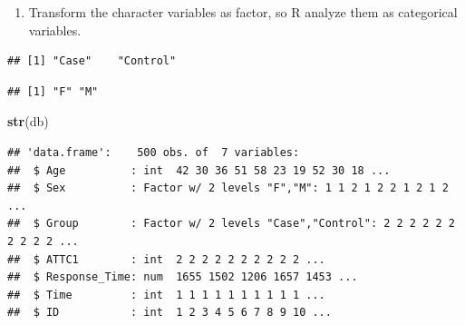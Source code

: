 \documentclass[
]{article}
\newenvironment{Shaded}{\begin{snugshade}}{\end{snugshade}}
\newcommand{\FunctionTok}[1]{\textcolor[rgb]{0.13,0.29,0.53}{\textbf{#1}}}
\newcommand{\NormalTok}[1]{#1}
\newcommand{\OtherTok}[1]{\textcolor[rgb]{0.56,0.35,0.01}{#1}}
\newcommand{\SpecialCharTok}[1]{\textcolor[rgb]{0.81,0.36,0.00}{\textbf{#1}}}
\providecommand{\tightlist}{%
  \setlength{\itemsep}{0pt}\setlength{\parskip}{0pt}}
\begin{document}
\begin{enumerate}
\def\labelenumi{\alph{enumi}.}
\setcounter{enumi}{3}
\tightlist
\item
  Transform the character variables as factor, so R analyze them as
  categorical variables.
\end{enumerate}

\begin{Shaded}
\end{Shaded}

\begin{verbatim}
## [1] "Case"    "Control"
\end{verbatim}

\begin{Shaded}
\end{Shaded}

\begin{verbatim}
## [1] "F" "M"
\end{verbatim}

\begin{Shaded}
\begin{Highlighting}[]
\FunctionTok{str}\NormalTok{(db)}
\end{Highlighting}
\end{Shaded}

\begin{verbatim}
## 'data.frame':    500 obs. of  7 variables:
##  $ Age          : int  42 30 36 51 58 23 19 52 30 18 ...
##  $ Sex          : Factor w/ 2 levels "F","M": 1 1 2 1 2 2 1 2 1 2 ...
##  $ Group        : Factor w/ 2 levels "Case","Control": 2 2 2 2 2 2 2 2 2 2 ...
##  $ ATTC1        : int  2 2 2 2 2 2 2 2 2 2 ...
##  $ Response_Time: num  1655 1502 1206 1657 1453 ...
##  $ Time         : int  1 1 1 1 1 1 1 1 1 1 ...
##  $ ID           : int  1 2 3 4 5 6 7 8 9 10 ...
\end{verbatim}
\end{document}
